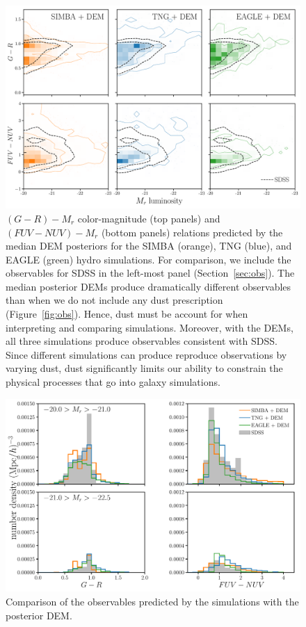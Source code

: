 \begin{figure}
\begin{center}
    \includegraphics[width=\textwidth]{figs/abc_observables.pdf}
    \caption{\label{fig:dem}
    $(G-R) - M_r$ color-magnitude (top panels) and $(FUV-NUV) - M_r$ (bottom
    panels) relations predicted by the median DEM posteriors for the SIMBA
    (orange), TNG (blue), and EAGLE (green) hydro simulations. For comparison, 
    we include the observables for SDSS in the left-most panel
    (Section~\ref{sec:obs}). The median posterior DEMs produce dramatically 
    different observables than when we do not include any dust prescription
    (Figure~\ref{fig:obs}). Hence, dust must be account for when interpreting 
    and comparing simulations. Moreover, with the DEMs, all three simulations
    produce observables consistent with SDSS. Since different simulations can 
    produce reproduce observations by varying dust, dust significantly limits
    our ability to constrain the physical processes that go into galaxy
    simulations. 
    }
\end{center}
\end{figure}


\begin{figure}
\begin{center}
    \includegraphics[width=\textwidth]{figs/abc_observables_mr_bin.pdf}
    \caption{Comparison of the observables predicted by the simulations with
    the posterior DEM.}
\label{fig:demcloseup}
\end{center}
\end{figure}



